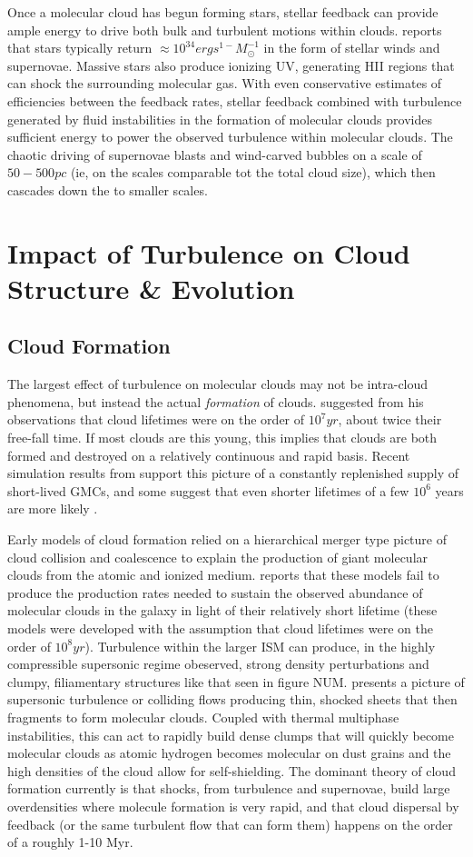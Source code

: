 \documentclass[12pt, preprint]{aastex}
\begin{document}
Once a molecular cloud has begun forming stars, stellar feedback can provide
ample energy to drive both bulk and turbulent motions within clouds.
\citet{agertz2012} reports that stars typically return 
$\approx 10^{34} erg s^{1-} M_\odot^{-1}$ in the form of stellar winds and
supernovae.  Massive stars also produce ionizing UV, generating HII regions that
can shock the surrounding molecular gas.  With even conservative estimates of
efficiencies between the feedback rates, stellar feedback combined with
turbulence generated by fluid instabilities in the formation of molecular clouds
provides sufficient energy to power the observed turbulence within molecular
clouds\citep{elm2004}.  The chaotic driving of supernovae blasts and wind-carved
bubbles on a scale of $50-500pc$ (ie, on the scales comparable tot the total
cloud size), which then cascades down the to smaller scales.
\section{Impact of Turbulence on Cloud Structure \& Evolution}
\subsection{Cloud Formation}
The largest effect of turbulence on molecular clouds may not be intra-cloud
phenomena, but instead the actual \textit{formation} of clouds.
\citet{larson1981} suggested from his observations that cloud lifetimes were on
the order of $10^7 yr$, about twice their free-fall time.  If most clouds are
this young, this implies that clouds are both formed and destroyed on a
relatively continuous and rapid basis. Recent simulation results from
\citet{hopk2011} support this picture of a constantly replenished supply of
short-lived GMCs, and some suggest that even shorter lifetimes of a few $10^6$
years are more likely \cite{mac2004}.

Early models of cloud formation relied on a hierarchical merger type picture of
cloud collision and coalescence to explain the production of giant molecular
clouds from the atomic and ionized medium.  \citet{larson1981} reports that
these models fail to produce the production rates needed to sustain the observed
abundance of molecular clouds in the galaxy in light of their relatively short
lifetime (these models were developed with the assumption that cloud lifetimes
were on the order of $10^8 yr$).  Turbulence within the larger ISM can produce, 
in the highly compressible supersonic regime obeserved, strong density perturbations and
clumpy, filiamentary structures like that seen in figure NUM.  \citet{val2004}
presents a picture of supersonic turbulence or colliding flows producing thin, 
shocked sheets that then fragments to form molecular clouds. Coupled with
thermal multiphase instabilities, this can act to rapidly build dense clumps
that will quickly become molecular clouds as atomic hydrogen becomes molecular
on dust grains and the high densities of the cloud allow for self-shielding.
The dominant theory of cloud formation currently is that shocks, from turbulence
and supernovae, build large overdensities where molecule formation is very
rapid, and that cloud dispersal by feedback (or the same turbulent flow that
can form them) happens on the order of a roughly 1-10 Myr.
\end{document}

